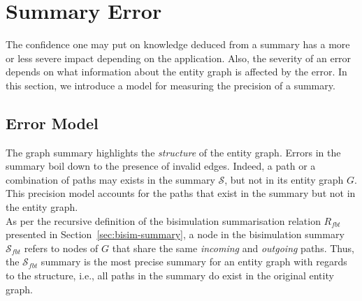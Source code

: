\section{Summary Error}

The confidence one may put on knowledge deduced from a summary has a more or less severe impact depending on the application. Also, the severity of an error depends on what information about the entity graph is affected by the error. In this section, we introduce a model for measuring the precision of a summary.

\subsection{Error Model}

The graph summary highlights the \emph{structure} of the entity graph. Errors in the summary boil down to the presence of invalid edges. Indeed, a path or a combination of paths may exists in the summary $\mathcal{S}$, but not in its entity graph $G$. This precision model accounts for the paths that exist in the summary but not in the entity graph.\\

%

As per the recursive definition of the bisimulation summarisation relation $R_{fbt}$ presented in Section~\ref{sec:bisim-summary}, a node in the bisimulation summary $\mathcal{S}_{fbt}$ refers to nodes of $G$ that share the same \emph{incoming} and \emph{outgoing} paths. Thus, the $\mathcal{S}_{fbt}$ summary is the most precise summary for an entity graph with regards to the structure, i.e., all paths in the summary do exist in the original entity graph.

